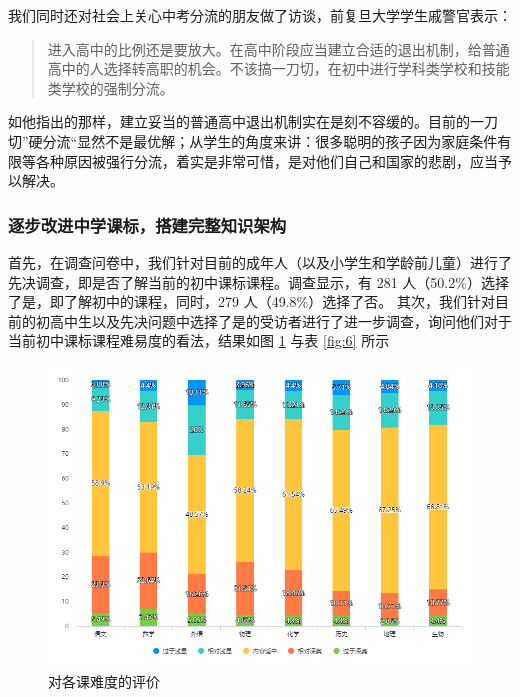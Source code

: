 \documentclass[12pt,UTF8]{ctexart}
\begin{document}
\par {
	我们同时还对社会上关心中考分流的朋友做了访谈，前复旦大学学生戚警官表示：
	\begin{quote}
		\kaishu
		进入高中的比例还是要放大。在高中阶段应当建立合适的退出机制，给普通高中的人选择转高职的机会。不该搞一刀切，在初中进行学科类学校和技能类学校的强制分流。
	\end{quote}
	
	如他指出的那样，建立妥当的普通高中退出机制实在是刻不容缓的。目前的一刀切”硬分流“显然不是最优解；从学生的角度来讲：很多聪明的孩子因为家庭条件有限等各种原因被强行分流，着实是非常可惜，是对他们自己和国家的悲剧，应当予以解决。
}

\subsubsection {逐步改进中学课标，搭建完整知识架构}
\par {
	首先，在调查问卷中，我们针对目前的成年人（以及小学生和学龄前儿童）进行了先决调查，即是否了解当前的初中课标课程。调查显示，有 281
	人（50.2\%）选择了是，即了解初中的课程，同时，279 人（49.8\%）选择了否。
	其次，我们针对目前的初高中生以及先决问题中选择了是的受访者进行了进一步调查，询问他们对于当前初中课标课程难易度的看法，结果如图 \ref{fig:5} 与表
	\ref{fig:6} 所示
}
\begin{figure}[!h]
	\centering
	\includegraphics[width=4.6in]{chart/5.png}
	\caption{对各课难度的评价}
	\label{fig:5}
\end{figure}
\end{document}
